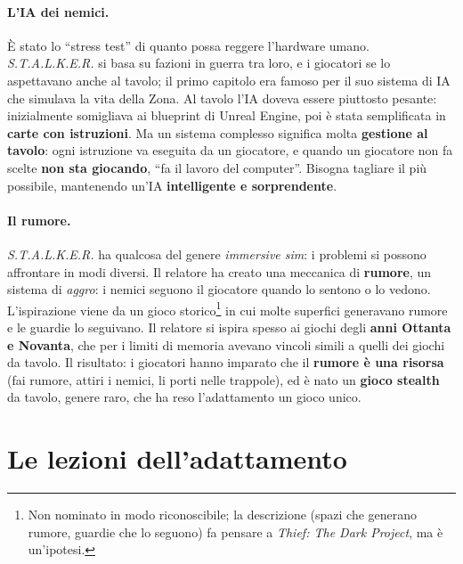 \paragraph{L'IA dei nemici.} È stato lo ``stress test'' di quanto possa reggere
l'hardware umano. \emph{S.T.A.L.K.E.R.} si basa su fazioni in guerra tra loro, e i
giocatori se lo aspettavano anche al tavolo; il primo capitolo era famoso per il
suo sistema di IA che simulava la vita della Zona. Al tavolo l'IA doveva essere
piuttosto pesante: inizialmente somigliava ai blueprint di Unreal Engine, poi è
stata semplificata in \textbf{carte con istruzioni}. Ma un sistema complesso
significa molta \textbf{gestione al tavolo}: ogni istruzione va eseguita da un
giocatore, e quando un giocatore non fa scelte \textbf{non sta giocando}, ``fa il
lavoro del computer''. Bisogna tagliare il più possibile, mantenendo un'IA
\textbf{intelligente e sorprendente}.

\paragraph{Il rumore.} \emph{S.T.A.L.K.E.R.} ha qualcosa del genere \emph{immersive
sim}: i problemi si possono affrontare in modi diversi. Il relatore ha creato una
meccanica di \textbf{rumore}, un sistema di \emph{aggro}: i nemici seguono il
giocatore quando lo sentono o lo vedono. L'ispirazione viene da un gioco
storico\footnote{Non nominato in modo riconoscibile; la descrizione (spazi che
generano rumore, guardie che lo seguono) fa pensare a \emph{Thief: The Dark
Project}, ma è un'ipotesi.} in cui molte superfici generavano rumore e le guardie lo
seguivano. Il relatore si ispira spesso ai giochi degli \textbf{anni Ottanta e
Novanta}, che per i limiti di memoria avevano vincoli simili a quelli dei giochi da
tavolo. Il risultato: i giocatori hanno imparato che il \textbf{rumore è una
risorsa} (fai rumore, attiri i nemici, li porti nelle trappole), ed è nato un
\textbf{gioco stealth} da tavolo, genere raro, che ha reso l'adattamento un gioco
unico.

\section{Le lezioni dell'adattamento}
\label{sec:c3-5-lezioni}

